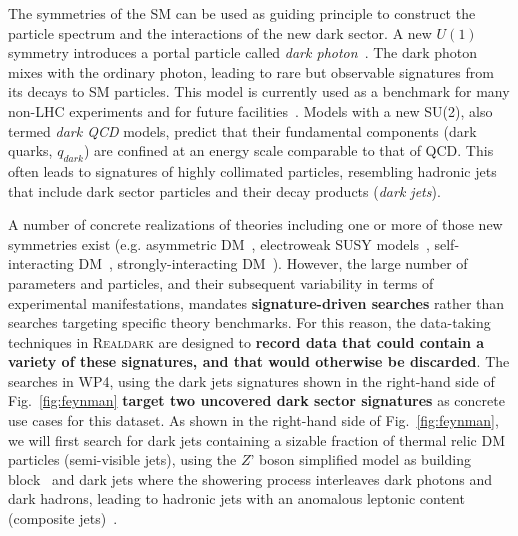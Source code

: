 The symmetries of the SM can be used as guiding principle to construct the particle spectrum and the interactions of the new dark sector. 
A new $U(1)$ symmetry introduces a portal particle called \textit{dark photon}~\cite{Holdom:1985ag,Curtin:2014cca}.   
The dark photon mixes with the ordinary photon, leading to rare but observable signatures from its decays to SM particles. 
This model is currently used as a benchmark for many non-LHC experiments and for future facilities~\cite{Strategy:2019vxc}. 
Models with a new SU(2), also termed \textit{dark QCD} models, predict that their fundamental components (dark quarks, $q_{dark}$) are confined at an energy scale comparable to that of QCD. 
This often leads to signatures of highly collimated particles, resembling hadronic jets that include dark sector particles and their decay products (\textit{dark jets}). 

A number of concrete realizations of theories including one or more of those new symmetries exist (e.g. asymmetric DM~\cite{Zurek:2013wia}, electroweak SUSY models~\cite{Cheung:2009su}, self-interacting DM~\cite{Tulin:2017ara}, strongly-interacting DM~\cite{Bernreuther:2019pfb}). 
However, the large number of parameters and particles, and their subsequent variability in terms of experimental manifestations, mandates \textbf{signature-driven searches} rather than searches targeting specific theory benchmarks. 
For this reason, the data-taking techniques in \textsc{Realdark} are designed to \textbf{record data that could contain a variety of these signatures, and that would otherwise be discarded}. The searches in WP4, using the dark jets signatures shown in the right-hand side of Fig.~\ref{fig:feynman} \textbf{target two uncovered dark sector signatures} as concrete use cases for this dataset. As shown in the right-hand side of Fig.~\ref{fig:feynman}, we will first search for dark jets containing a sizable fraction of thermal relic DM particles (semi-visible jets), using the $Z’$ boson simplified model as building block~\cite{Bernreuther:2019pfb,Cohen:2017pzm} and dark jets where the showering process interleaves dark photons and dark hadrons, leading to hadronic jets with an anomalous leptonic content (composite jets)~\cite{Cheung:2009su,Park:2017rfb}.
%


